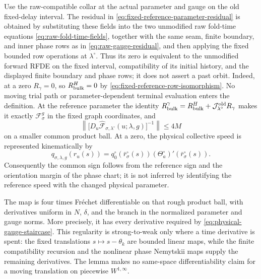 \begin{lemma}
Use the raw-compatible collar at the actual parameter and gauge on the
old fixed-delay interval.  The residual in
\cref{eq:fixed-reference-parameter-residual} is obtained by substituting
these fields into the two unmodified raw fold-time equations
\cref{eq:raw-fold-time-fields}, together with the same seam, finite
boundary, and inner phase rows as in
\cref{eq:raw-gauge-residual}, and then applying the fixed bounded row
operations at $\lambda^\circ$.  Thus its zero is equivalent to the
unmodified forward RFDE on the fixed interval, compatibility of its
initial history, and the displayed finite boundary and phase rows; it does
not assert a past orbit.  Indeed, at a zero $R_\gamma=0$, so
$R_{\rm bulk}^{H}=0$ by
\cref{eq:fixed-reference-row-isomorphism}.  No moving trial path or
parameter-dependent terminal evaluation enters the definition.  At the
reference parameter the identity
$R_{\rm bulk}^{\gamma}=R_{\rm bulk}^{H}
 +\mathcal J_{\lambda^\circ}^{\rm old}R_\gamma$
makes it exactly
$\mathcal F_\sigma^g$ in the fixed graph coordinates, and
\begin{equation}
 \left\|\bigl[D_u\widehat{\mathcal F}_{\sigma,\lambda^\circ}
       (u;\lambda,g)\bigr]^{-1}\right\|\le4M       \label{eq:fixed-reference-parameter-inverse}
\end{equation}
on a smaller common product ball.
At a zero, the physical collective speed is represented kinematically by
\begin{equation}
 q_{\sigma,\lambda,g}(r_u(s))
 =q_0^\circ(\bar r_\sigma^\circ(s))
       (\Theta_a^\circ)'(\bar r_\sigma^\circ(s)). \label{eq:fixed-reference-speed-identity}
\end{equation}
Consequently the common sign follows from the reference sign and the
orientation margin of the phase chart; it is not inferred by identifying
the reference speed with the changed physical parameter.

The map is four times Fr\'{e}chet differentiable on that rough product
ball, with derivatives uniform in $N$, $\delta$, and the branch in the
normalized parameter and gauge norms.  More precisely, it has every derivative required by
\cref{eq:physical-gauge-staircase}.  This regularity is strong-to-weak only
where a time derivative is spent: the fixed translations
$s\mapsto s-\theta_k$ are bounded linear maps, while the finite
compatibility recursion and the nonlinear phase Nemytskii maps supply the
remaining derivatives.  The lemma makes no same-space differentiability
claim for a moving translation on piecewise $W^{1,\infty}$.
\end{lemma}

